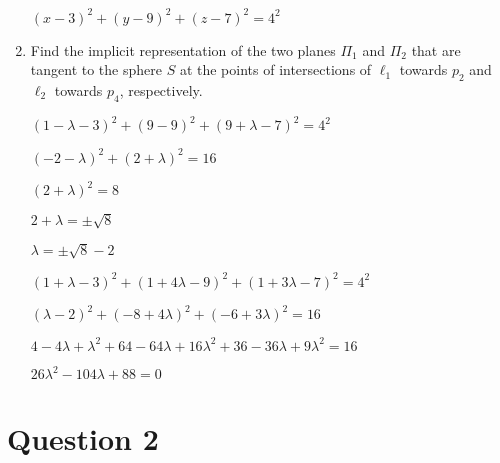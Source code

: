 \documentclass{article}
\begin{document}
\begin{enumerate}
        $(x - 3)^2 + (y - 9)^2 + (z - 7)^2 = 4^2$

        \item Find the implicit representation of the two planes $\Pi_1$ and $\Pi_2$ that are tangent to the sphere $S$ at the points of intersections of $\ell_1$ towards $p_2$ and $\ell_2$ towards $p_4$, respectively.
        
        $(1 - \lambda - 3)^2 + (9 - 9)^2 + (9 + \lambda - 7)^2 = 4^2$

        $(-2 - \lambda)^2 + (2 + \lambda)^2 = 16$

        $(2 + \lambda)^2 = 8$

        $2 + \lambda = \pm \sqrt{8}$

        $\lambda = \pm \sqrt{8} - 2$


        $(1 + \lambda - 3)^2 + (1 + 4 \lambda - 9)^2 + (1 + 3 \lambda - 7)^2 = 4^2$

        $(\lambda - 2)^2 + (-8 + 4\lambda)^2 + (-6 + 3 \lambda)^2 = 16$

        $4 - 4 \lambda + \lambda^2 + 64 - 64\lambda + 16 \lambda^2 + 36 - 36\lambda + 9 \lambda^2 = 16$

        $26 \lambda^2 - 104 \lambda + 88 = 0$



    \end{enumerate}
    \section*{Question 2}
\end{document}
